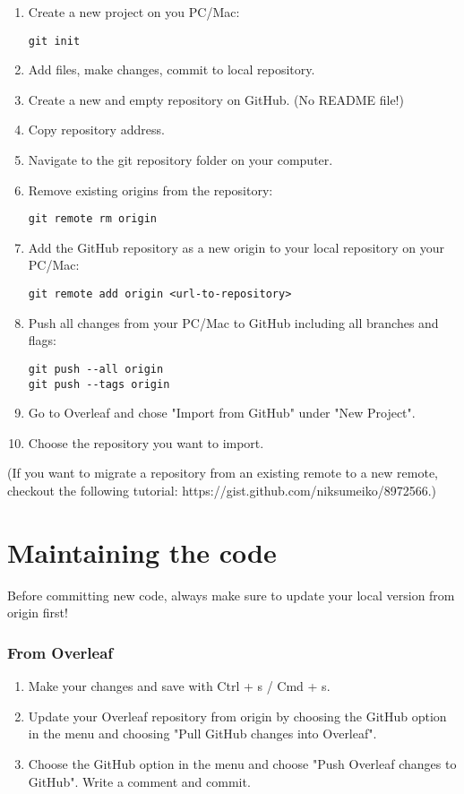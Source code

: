 \documentclass{article}
\begin{document}
\begin{enumerate}
    \item Create a new project on you PC/Mac:
    \begin{verbatim}
git init
    \end{verbatim}
    \item Add files, make changes, commit to local repository.
    \item Create a new and empty repository on GitHub. (No README file!)
    \item Copy repository address.
    \item Navigate to the git repository folder on your computer. 
    \item Remove existing origins from the repository:
    \begin{verbatim}
git remote rm origin
    \end{verbatim}
    \item Add the GitHub repository as a new origin to your local repository on your PC/Mac:
    \begin{verbatim}
git remote add origin <url-to-repository>
    \end{verbatim}
    \item Push all changes from your PC/Mac to GitHub including all branches and flags:
    \begin{verbatim}
git push --all origin
git push --tags origin
    \end{verbatim}
    \item Go to Overleaf and chose "Import from GitHub" under "New Project".
    \item Choose the repository you want to import.
\end{enumerate}

(If you want to migrate a repository from an existing remote to a new remote, checkout the following tutorial: https://gist.github.com/niksumeiko/8972566.)

\section{Maintaining the code}

Before committing new code, always make sure to update your local version from origin first!

\subsubsection{From Overleaf}

\begin{enumerate}
    \item Make your changes and save with Ctrl + s / Cmd + s.
    \item Update your Overleaf repository from origin by choosing the GitHub option in the menu and choosing "Pull GitHub changes into Overleaf".
    \item Choose the GitHub option in the menu and choose "Push Overleaf changes to GitHub". Write a comment and commit.
\end{enumerate}
\end{document}
